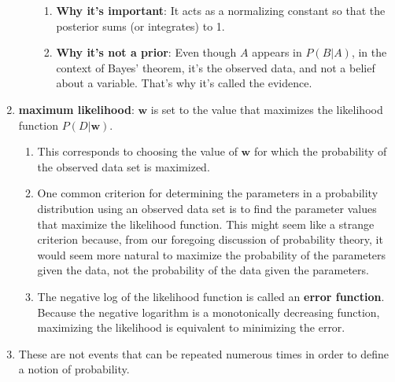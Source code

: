 \begin{enumerate}
\begin{enumerate}
\begin{enumerate}
            \item \textbf{Why it's important}: It acts as a normalizing constant so that the posterior sums (or integrates) to 1.
            \hfill \cite{common/online/chatgpt}

            \item \textbf{Why it's not a prior}: Even though $A$ appears in $P(B|A)$, in the context of Bayes’ theorem, it’s the observed data, and not a belief about a variable. That’s why it’s called the evidence.
            \hfill \cite{common/online/chatgpt}
        \end{enumerate}
    \end{enumerate}

    \item \textbf{maximum likelihood}: $\bm{w}$ is set to the value that maximizes the likelihood function $P(D|\bm{w})$.
    \begin{enumerate}
        \item This corresponds to choosing the value of $\bm{w}$ for which the probability of the observed data set is maximized.
        \hfill \cite{ml/book/Pattern-Recognition-And-Machine-Learning/Christopher-M-Bishop}

        \item One common criterion for determining the parameters in a probability distribution using an observed data set is to find the parameter values that maximize the likelihood function.
        This might seem like a strange criterion because, from our foregoing discussion of probability theory, it would seem more natural to maximize the probability of the parameters given the data, not the probability of the data given the parameters.
        \hfill \cite{ml/book/Pattern-Recognition-And-Machine-Learning/Christopher-M-Bishop}

        \item The negative log of the likelihood function is called an \textbf{error function}.
        Because the negative logarithm is a monotonically decreasing function, maximizing the likelihood is equivalent to minimizing the error.
        \hfill \cite{ml/book/Pattern-Recognition-And-Machine-Learning/Christopher-M-Bishop}
    \end{enumerate}
    
    \item These are not events that can be repeated numerous times in order to define a notion of probability.
    \hfill \cite{ml/book/Pattern-Recognition-And-Machine-Learning/Christopher-M-Bishop}


\end{enumerate}

